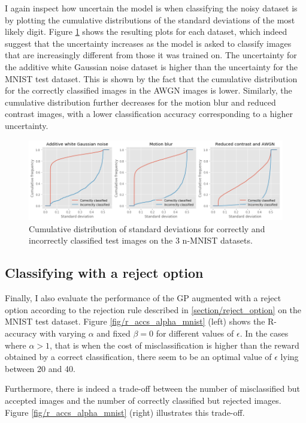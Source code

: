 \documentclass{article}
\begin{document}
I again inspect how uncertain the model is when classifying the noisy dataset is by plotting the cumulative distributions of the standard deviations of the most likely digit. Figure \ref{fig/noisy_mnist_cum_stds} shows the resulting plots for each dataset, which indeed suggest that the uncertainty increases as the model is asked to classify images that are increasingly different from those it was trained on. The uncertainty for the additive white Gaussian noise dataset is higher than the uncertainty for the MNIST test dataset. This is shown by the fact that the cumulative distribution for the correctly classified images in the AWGN images is lower. Similarly, the cumulative distribution further decreases for the motion blur and reduced contrast images, with a lower classification accuracy corresponding to a higher uncertainty.

\begin{figure}
	\centering
	\includegraphics[scale=0.4]{noisy_mnist_cum_stds}
	\caption{Cumulative distribution of standard deviations for correctly and incorrectly classified test images on the 3 n-MNIST datasets.}
	\label{fig/noisy_mnist_cum_stds}
\end{figure}

\subsection{Classifying with a reject option}
Finally, I also evaluate the performance of the GP augmented with a reject option according to the rejection rule described in \ref{section/reject_option} on the MNIST test dataset. Figure \ref{fig/r_accs_alpha_mnist} (left) shows the R-accuracy with varying $\alpha$ and fixed $\beta=0$ for different values of $\epsilon$. In the cases where $\alpha > 1$, that is when the cost of misclassification is higher than the reward obtained by a correct classification, there seem to be an optimal value of $\epsilon$ lying between 20 and 40. 

Furthermore, there is indeed a trade-off between the number of misclassified but accepted images and the number of correctly classified but rejected images. Figure \ref{fig/r_accs_alpha_mnist} (right) illustrates this trade-off.
\end{document}
